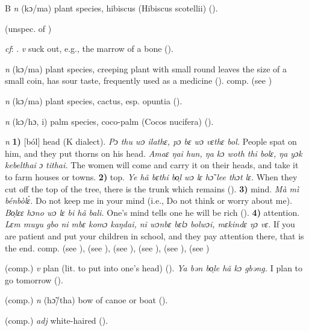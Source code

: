 \begin{letter}{B}
 \textit{n} (kɔ/ma) plant species, hibiscus (Hibiscus scotellii) (\citealt{Pichl1967}). 

 (unspec. of ) 

 \textit{cf}: . \textit{v} suck out, e.g., the marrow of a bone (\citealt{Pichl1967}). 

 \textit{n} (kɔ/ma) plant species, creeping plant with small round leaves the size of a small coin, has sour taste, frequently used as a medicine (\citealt{Pichl1967}). comp.  (see ) 

 \textit{n} (kɔ/ma) plant species, cactus, esp. opuntia (\citealt{Pichl1967}). 

 \textit{n} (kɔ/hɔ, i) palm species, coco-palm (Cocos nucifera) (\citealt{Pichl1967}).

 \textit{n} \textbf{1)} [ból] head (K dialect). \textit{Pɔ thu wɔ ilathɛ, pɔ bɛ wɔ vɛthɛ bol.} People spat on him, and they put thorns on his head. \textit{Amaɛ ŋai hun, ŋa kɔ woth thi bolɛ, ŋa yɔk kebelthai ɔ tithai.} The women will come and carry it on their heads, and take it to farm houses or towns. \textbf{2)} top. \textit{Ye hã bɛthi bo̹l wɔ lɛ hɔ̃ lee thɔt lɛ.} When they cut off the top of the tree, there is the trunk which remains (\citealt{Pichl1967}). \textbf{3)} mind. \textit{Mà mì bénbòlɛ̀.} Do not keep me in your mind (i.e., Do not think or worry about me). \textit{Bo̹lɛɛ hɔno wɔ lɛ bi hã bali.} One's mind tells one he will be rich (\citealt{Pichl1967}). \textbf{4)} attention. \textit{Lɛm muyu gbo ni mbɛ komɔ kaŋdai, ni wɔnbɛ bɛlɔ bolwɔi, mɛkindɛ ŋɔ vɛ.} If you are patient and put your children in school, and they pay attention there, that is the end. comp.  (see ),  (see ),  (see ),  (see ),  (see ),  (see )

 (comp.) \textit{v} plan (lit. to put into one's head) (\citealt{Pichl1967}). \textit{Ya bən bo̹le hã kɔ gbəng.} I plan to go tomorrow (\citealt{Pichl1967}).

 (comp.) \textit{n} (hɔ̃/tha) bow of canoe or boat (\citealt{Pichl1967}).

 (comp.) \textit{adj} white-haired (\citealt{Pichl1967}).


\end{letter}
